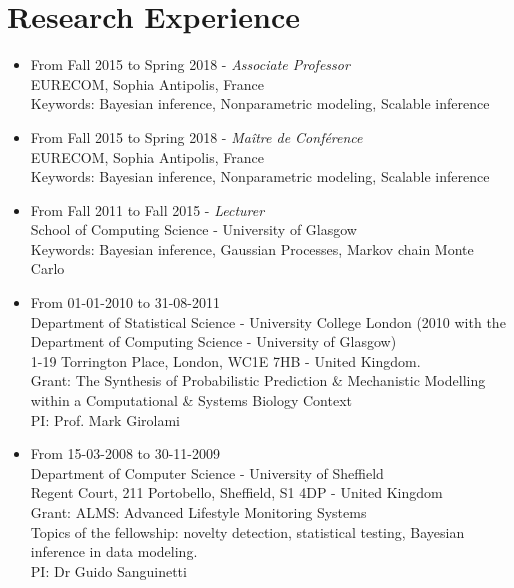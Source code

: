 \documentclass[a4paper,10pt]{article}
\begin{document}
\section*{Research Experience}
\begin{itemize}
\item From Fall 2015 to Spring 2018 - {\em Associate Professor} \\
  EURECOM, Sophia Antipolis, France \\
  Keywords: Bayesian inference, Nonparametric modeling, Scalable inference

\item From Fall 2015 to Spring 2018 - {\em Ma\^{i}tre de Conf\'{e}rence} \\
  EURECOM, Sophia Antipolis, France \\
  Keywords: Bayesian inference, Nonparametric modeling, Scalable inference

\item From Fall 2011 to Fall 2015 - {\em Lecturer} \\
  School of Computing Science - University of Glasgow \\
  Keywords: Bayesian inference, Gaussian Processes, Markov chain Monte Carlo


\item From 01-01-2010 to 31-08-2011 \\
  Department of Statistical Science - University College London (2010 with the Department of Computing Science - University of Glasgow) \\
  1-19 Torrington Place, London, WC1E 7HB - United Kingdom. \\
  Grant: The Synthesis of Probabilistic Prediction \& Mechanistic Modelling within a Computational \& Systems Biology Context \\
  PI: Prof. Mark Girolami

\item From 15-03-2008 to 30-11-2009 \\
  Department of Computer Science - University of Sheffield \\
  Regent Court, 211 Portobello, Sheffield, S1 4DP - United Kingdom \\
  Grant: ALMS: Advanced Lifestyle Monitoring Systems \\
  Topics of the fellowship: novelty detection, statistical testing, Bayesian inference in data modeling. \\
  PI: Dr Guido Sanguinetti


\end{itemize}
\end{document}
